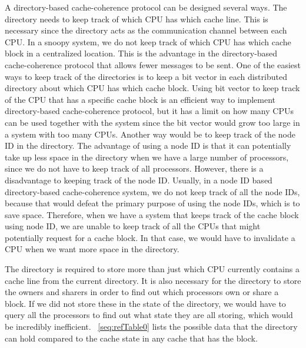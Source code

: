 \documentclass[letterpaper]{article}
\begin{document}
A directory-based cache-coherence protocol can be designed several ways. The directory needs to keep track of which CPU has which cache line. This is necessary since the directory acts as the communication channel between each CPU. In a snoopy system, we do not keep track of which CPU has which cache block in a centralized location. This is the advantage in the directory-based cache-coherence protocol that allows fewer messages to be sent. One of the easiest ways to keep track of the directories is to keep a bit vector in each distributed directory about which CPU has which cache block. Using bit vector to keep track of the CPU that has a specific cache block is an efficient way to implement directory-based cache-coherence protocol, but it has a limit on how many CPUs can be used together with the system since the bit vector would grow too large in a system with too many CPUs. Another way would be to keep track of the node ID in the directory. The advantage of using a node ID is that it can potentially take up less space in the directory when we have a large number of processors, since we do not have to keep track of all processors. However, there is a disadvantage to keeping track of the node ID. Usually, in a node ID based directory-based cache-coherence system, we do not keep track of all the node IDs, because that would defeat the primary purpose of using the node IDs, which is to save space. Therefore, when we have a system that keeps track of the cache block using node ID, we are unable to keep track of all the CPUs that might potentially request for a cache block. In that case, we would have to invalidate a CPU when we want more space in the directory.

The directory is required to store more than just which CPU currently contains a cache line from the current directory. It is also necessary for the directory to store the owners and sharers in order to find out which processors own or share a block. If we did not store these in the state of the directory, we would have to query all the processors to find out what state they are all storing, which would be incredibly inefficient. \tablename~\ref{seq:refTable0} lists the possible data that the directory can hold compared to the cache state in any cache that has the block.
\end{document}
